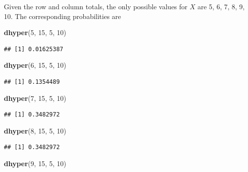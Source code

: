 \documentclass[
]{book}
\newenvironment{Shaded}{\begin{snugshade}}{\end{snugshade}}
\newcommand{\DecValTok}[1]{\textcolor[rgb]{0.00,0.00,0.81}{#1}}
\newcommand{\FunctionTok}[1]{\textcolor[rgb]{0.13,0.29,0.53}{\textbf{#1}}}
\newcommand{\NormalTok}[1]{#1}
\theoremstyle{definition}
\theoremstyle{definition}
\theoremstyle{definition}
\theoremstyle{definition}
\theoremstyle{remark}
\begin{document}
Given the row and column totals, the only possible values for \(X\) are 5, 6, 7, 8, 9, 10. The corresponding probabilities are

\begin{Shaded}
\begin{Highlighting}[]
\FunctionTok{dhyper}\NormalTok{(}\DecValTok{5}\NormalTok{, }\DecValTok{15}\NormalTok{, }\DecValTok{5}\NormalTok{, }\DecValTok{10}\NormalTok{)}
\end{Highlighting}
\end{Shaded}

\begin{verbatim}
## [1] 0.01625387
\end{verbatim}

\begin{Shaded}
\begin{Highlighting}[]
\FunctionTok{dhyper}\NormalTok{(}\DecValTok{6}\NormalTok{, }\DecValTok{15}\NormalTok{, }\DecValTok{5}\NormalTok{, }\DecValTok{10}\NormalTok{)}
\end{Highlighting}
\end{Shaded}

\begin{verbatim}
## [1] 0.1354489
\end{verbatim}

\begin{Shaded}
\begin{Highlighting}[]
\FunctionTok{dhyper}\NormalTok{(}\DecValTok{7}\NormalTok{, }\DecValTok{15}\NormalTok{, }\DecValTok{5}\NormalTok{, }\DecValTok{10}\NormalTok{)}
\end{Highlighting}
\end{Shaded}

\begin{verbatim}
## [1] 0.3482972
\end{verbatim}

\begin{Shaded}
\begin{Highlighting}[]
\FunctionTok{dhyper}\NormalTok{(}\DecValTok{8}\NormalTok{, }\DecValTok{15}\NormalTok{, }\DecValTok{5}\NormalTok{, }\DecValTok{10}\NormalTok{)}
\end{Highlighting}
\end{Shaded}

\begin{verbatim}
## [1] 0.3482972
\end{verbatim}

\begin{Shaded}
\begin{Highlighting}[]
\FunctionTok{dhyper}\NormalTok{(}\DecValTok{9}\NormalTok{, }\DecValTok{15}\NormalTok{, }\DecValTok{5}\NormalTok{, }\DecValTok{10}\NormalTok{)}
\end{Highlighting}
\end{Shaded}
\end{document}
